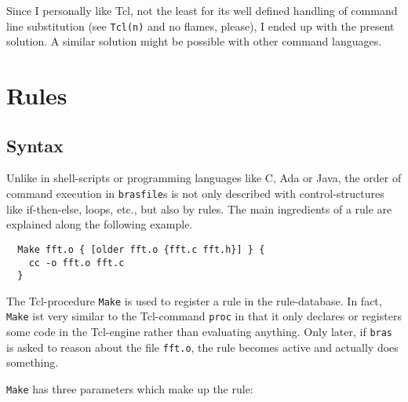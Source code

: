\documentclass[11pt,bibtotoc,idxtotoc]{scrreprt}
\makeatletter
\newcommand{\bras}{\texttt{bras}}
\newcommand{\brasfile}{\texttt{brasfile}}
\newcommand{\Indextt}[1]{\texttt{#1}\index{#1@\texttt{#1}}}
\makeatother
\begin{document}
Since I personally like Tcl, not the least for its well defined
handling of command line substitution (see \texttt{Tcl(n)} and no
flames, please), I ended up with the present solution. A similar
solution might be possible with other command languages.

\section{Rules}
\label{SecDefTerms}

\subsection{Syntax}
Unlike in shell-scripts or programming languages like C, Ada or Java,
the order of command execution in \brasfile{}s is not only described
with control-structures like if-then-else, loops, etc., but also by
rules.  The main ingredients of a rule are explained along the
following example.

\begin{verbatim}
  Make fft.o { [older fft.o {fft.c fft.h}] } {
    cc -o fft.o fft.c
  }
\end{verbatim}

The Tcl-procedure \Indextt{Make} is used to register a rule in the
rule-database. In fact, \texttt{Make} ist very similar to the
Tcl-command \texttt{proc} in that it only declares or registers some
code in the Tcl-engine rather than evaluating anything. Only later, if 
\bras{} is asked to reason about the file \texttt{fft.o}, the rule
becomes active and actually does something.

\texttt{Make} has three parameters which make up the rule:
\end{document}

